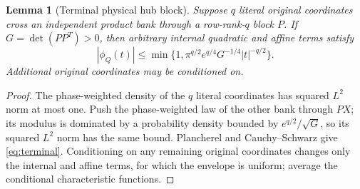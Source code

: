 \documentclass[11pt]{article}
\numberwithin{equation}{section}
\newtheorem{lemma}[theorem]{Lemma}
\theoremstyle{definition}\newtheorem{definition}[theorem]{Definition}
\theoremstyle{remark}\newtheorem{remark}[theorem]{Remark}
\newcommand{\1}{\mathbf 1}\newcommand{\diag}{\operatorname{diag}}
\begin{document}
\begin{lemma}[Terminal physical hub block]\label{lem:terminal}
Suppose $q$ literal original coordinates cross an independent product bank through a row-rank-$q$ block $P$. If $G=\det(PP^T)>0$, then arbitrary internal quadratic and affine terms satisfy
\begin{equation}\label{eq:terminal}
 |\phi_Q(t)|\le\min\{1,\pi^{q/2}e^{q/4}G^{-1/4}|t|^{-q/2}\}.
\end{equation}
Additional original coordinates may be conditioned on.
\end{lemma}
\begin{proof}
The phase-weighted density of the $q$ literal coordinates has squared $L^2$ norm at most one. Push the phase-weighted law of the other bank through $PX$; its modulus is dominated by a probability density bounded by $e^{q/2}/\sqrt G$, so its squared $L^2$ norm has the same bound. Plancherel and Cauchy--Schwarz give \eqref{eq:terminal}. Conditioning on any remaining original coordinates changes only the internal and affine terms, for which the envelope is uniform; average the conditional characteristic functions.
\end{proof}
\end{document}

